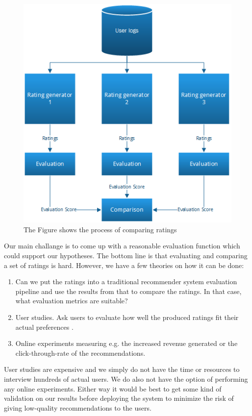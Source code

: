\begin{figure}[H]
		\centering
	  	\includegraphics[scale=0.7]{image/ratinggeneval.png}
		\caption[Comparing Ratings]{The Figure shows the process of comparing ratings}
		\label{figure:compareratings}
\end{figure}

Our main challange is to come up with a reasonable evaluation function which could support
our hypotheses. The bottom line is that evaluating and comparing a set of ratings is hard.
However, we have a few theories on how it can be done:

\begin{enumerate}
\item Can we put the ratings into a traditional recommender system evaluation pipeline and use the
	  results from that to compare the ratings. In that case, what evaluation metrics are suitable?
\item User studies. Ask users to evaluate how well the produced ratings fit their actual preferences \cite{parra2011walk}.
\item Online experiments measuring e.g. the increased revenue generated or the click-through-rate of the recommendations.
\end{enumerate}

User studies are expensive and we simply do not have the time or resources to interview hundreds of actual users.
We do also not have the option of performing any online experiments. Either way it would be best to
get some kind of validation on our results before deploying the system to minimize the risk of giving
low-quality recommendations to the users.

